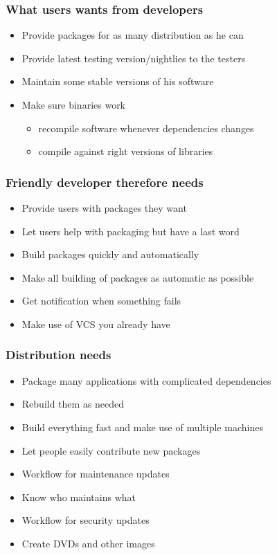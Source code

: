 
\begin{frame}[t]
\frametitle{What users wants from developers}
\begin{itemize}
\item Provide packages for as many distribution as he can
\item Provide latest testing version/nightlies to the testers
\item Maintain some stable versions of his software
\item Make sure binaries work
\begin{itemize}
\item recompile software whenever dependencies changes
\item compile against right versions of libraries
\end{itemize}
\end{itemize}
\end{frame}

\begin{frame}[t]
\frametitle{Friendly developer therefore needs}
\begin{itemize}
\item Provide users with packages they want
\item Let users help with packaging but have a last word
\item Build packages quickly and automatically
\item Make all building of packages as automatic as possible
\item Get notification when something fails
\item Make use of VCS you already have
\end{itemize}
\end{frame}

\begin{frame}[t]
\frametitle{Distribution needs}
\begin{itemize}
\item Package many applications with complicated dependencies
\item Rebuild them as needed
\item Build everything fast and make use of multiple machines
\item Let people easily contribute new packages
\item Workflow for maintenance updates
\item Know who maintains what
\item Workflow for security updates
\item Create DVDs and other images
\end{itemize}
\end{frame}
